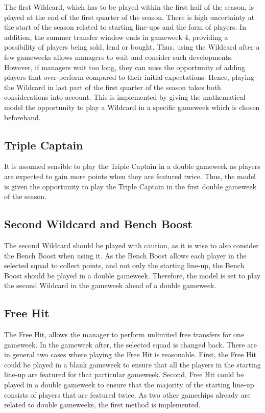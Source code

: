 The first Wildcard, which has to be played within the first half of the season, is played at the end of the first quarter of the season. There is high uncertainty at the start of the season related to starting line-ups and the form of players. In addition, the summer transfer window ends in gameweek 4, providing a possibility of players being sold, lend or bought. Thus, using the Wildcard after a few gameweeks allows managers to wait and consider such developments. However, if managers wait too long, they can miss the opportunity of adding players that over-perform compared to their initial expectations. Hence, playing the Wildcard in last part of the first quarter of the season takes both considerations into account. This is implemented by giving the mathematical model the opportunity to play a Wildcard in a specific gameweek which is chosen beforehand.

\subsection{Triple Captain}
It is assumed sensible to play the Triple Captain in a double gameweek as players are expected to gain more points when they are featured twice. Thus, the model is given the opportunity to play the Triple Captain in the first double gameweek of the season. 

\subsection{Second Wildcard and Bench Boost}
The second Wildcard should be played with caution, as it is wise to also consider the Bench Boost when using it. As the Bench Boost allows each player in the selected squad to collect points, and not only the starting line-up, the Bench Boost should be played in a double gameweek. Therefore, the model is set to play the second Wildcard in the gameweek ahead of a double gameweek.


\subsection{Free Hit}
The Free Hit, allows the manager to perform unlimited free transfers for one gameweek. In the gameweek after, the selected squad is changed back. There are in general two cases where playing the Free Hit is reasonable. First, the Free Hit could be played in a blank gameweek to ensure that all the players in the starting line-up are featured for that particular gameweek. Second, Free Hit could be played in a double gameweek to ensure that the majority of the starting line-up consists of players that are featured twice. As two other gamechips already are related to double gameweeks, the first method is implemented.

